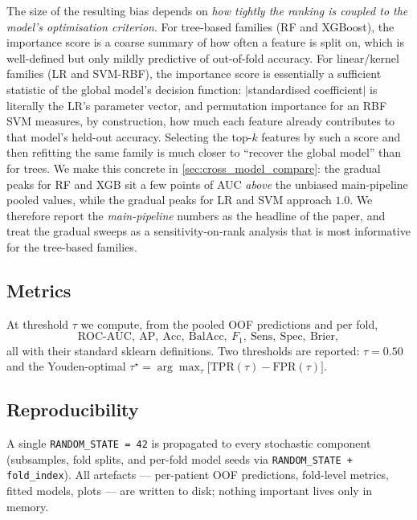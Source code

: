 \documentclass[11pt,a4paper]{article}
\providecommand{\Cref}[1]{\autoref{#1}}
\begin{document}
The size of the resulting bias depends on \emph{how tightly the ranking
is coupled to the model's optimisation criterion}. For tree-based
families (RF and XGBoost), the importance score is a coarse summary of
how often a feature is split on, which is well-defined but only mildly
predictive of out-of-fold accuracy. For linear/kernel families (LR and
SVM-RBF), the importance score is essentially a sufficient statistic of
the global model's decision function: $|$standardised coefficient$|$ is
literally the LR's parameter vector, and permutation importance for an
RBF SVM measures, by construction, how much each feature already
contributes to that model's held-out accuracy. Selecting the
top-$k$ features by such a score and then refitting the same family is
much closer to ``recover the global model'' than for trees. We make
this concrete in \Cref{sec:cross_model_compare}: the gradual peaks
for RF and XGB sit a few points of AUC \emph{above} the unbiased
main-pipeline pooled values, while the gradual peaks for LR and SVM
approach $1.0$. We therefore report the \emph{main-pipeline} numbers as
the headline of the paper, and treat the gradual sweeps as a
sensitivity-on-rank analysis that is most informative for the
tree-based families.

\subsection{Metrics}
At threshold $\tau$ we compute, from the pooled OOF predictions and per
fold,
\begin{equation*}
  \text{ROC-AUC},\
  \text{AP},\
  \text{Acc},\
  \text{BalAcc},\
  F_1,\
  \text{Sens},\
  \text{Spec},\
  \text{Brier},
\end{equation*}
all with their standard sklearn definitions. Two thresholds are reported:
$\tau=0.50$ and the Youden-optimal
$\tau^\star = \arg\max_{\tau} \bigl[\text{TPR}(\tau) - \text{FPR}(\tau)\bigr]$.

\subsection{Reproducibility}
A single \texttt{RANDOM\_STATE = 42} is propagated to every stochastic
component (subsamples, fold splits, and per-fold model seeds via
\texttt{RANDOM\_STATE + fold\_index}). All artefacts --- per-patient OOF
predictions, fold-level metrics, fitted models, plots --- are written to
disk; nothing important lives only in memory.

\end{document}
